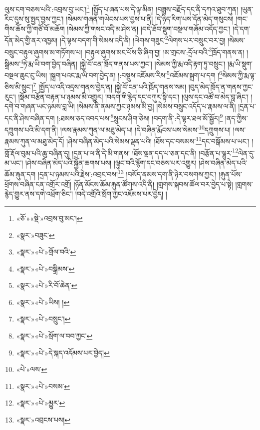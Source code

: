 ལུས་ངག་བཅས་པའི་:འབྲས་བུ་ཡང་།\footnote{«ཅོ་»«སྡེ་»འབྲས་བུ་མང་།} །སྤྱོད་པ་ཞན་པས་དེ་ལྟ་མིན། །བཟླས་བརྗོད་དང་ནི་དཀའ་ཐུབ་ཀུན། །ཡུན་རིང་དུས་སུ་སྤྱད་བྱས་ཀྱང་། །སེམས་གཞན་གཡེངས་པས་བྱས་པ་ནི། །དེ་ཉིད་རིག་པས་དོན་མེད་གསུངས། །གང་གིས་ཆོས་ཀྱི་གཙོ་བོ་མཆོག །སེམས་ཀྱི་གསང་འདི་མ་ཤེས་ན། །བདེ་ཐོབ་སྡུག་བསྔལ་གཞོམ་འདོད་ཀྱང་། །དེ་དག་དོན་མེད་གྱི་ནར་འཁྱམ། །དེ་ལྟས་བདག་གི་སེམས་འདི་ནི། །ལེགས་གཟུང་\footnote{«སྣར་»བཟུང་}ལེགས་པར་བསྲུང་བར་བྱ། །སེམས་བསྲུང་བརྟུལ་ཞུགས་མ་གཏོགས་པ། །བརྟུལ་ཞུགས་མང་པོས་ཅི་ཞིག་བྱ། །མ་གྲངས་:དྲོལ་བའི་\footnote{«སྣར་»«པེ་»གྲོལ་བའི་}ཁྲོད་གནས་ན། །སྒྲིམས་\footnote{«སྣར་»«པེ་»བསྒྲིམས་}ཏེ་རྨ་ཡི་བག་བྱེད་བཞིན། །སྐྱེ་བོ་ངན་ཁྲོད་གནས་པས་ཀྱང་། །སེམས་ཀྱི་རྨ་འདི་རྟག་ཏུ་བསྲུང་། །རྨ་ཡི་སྡུག་བསྔལ་ཆུང་ངུ་ཡིས། །སྐྲག་པའང་རྨ་ཡི་བག་བྱེད་ན། །:བསྡུས་འཇོམས་རིས་\footnote{«སྣར་»«པེ་»རི་བོ་ཆེན་}འཇོམས་སྐྲག་པ་དག །\footnote{«སྣར་»«པེ་»ཡིས། །}སེམས་ཀྱི་རྨ་ལྟ་ཅིས་མི་སྲུང་།\footnote{«སྣར་»«པེ་»བསྲུང་།} །སྤྱོད་པ་འདི་འདྲས་གནས་བྱེད་ན། །སྐྱེ་བོ་ངན་པའི་ཁྲོད་གནས་སམ། །བུད་མེད་ཁྲོད་ན་གནས་ཀྱང་རུང་། །སྡོམ་བརྩོན་བརྟན་པ་ཉམས་མི་འགྱུར། །བདག་གི་རྙེད་དང་བཀུར་སྟི་དང་། །ལུས་དང་འཚོ་བ་མེད་བླ་ཞིང་། །དགེ་བ་གཞན་ཡང་ཉམས་བླ་ཡི། །སེམས་ནི་ནམས་ཀྱང་ཉམས་མི་བྱ། །སེམས་བསྲུང་འདོད་པ་རྣམས་ལ་ནི། །དྲན་པ་དང་ནི་ཤེས་བཞིན་དག །:ཐམས་ཅད་འབད་པས་\footnote{«སྣར་»«པེ་»སྲོག་ལ་བབ་ཀྱང་}སྲུངས་ཤིག་ཅེས། །བདག་ནི་:དེ་ལྟར་ཐལ་མོ་སྦྱོར།\footnote{«སྣར་»«པེ་»དེ་སྐད་འདོམས་པར་བྱེད།} །ནད་ཀྱིས་དཀྲུགས་པའི་མི་དག་ནི། །ལས་རྣམས་ཀུན་ལ་མཐུ་མེད་པ། །དེ་བཞིན་རྨོངས་པས་སེམས་\footnote{«པེ་»ལས་}དཀྲུགས་པ། །ལས་རྣམས་ཀུན་ལ་མཐུ་མེད་དོ། །ཤེས་བཞིན་མེད་པའི་སེམས་ལྡན་པའི། །ཐོས་དང་བསམས་\footnote{«སྣར་»«པེ་»བསམ་}དང་བསྒོམས་པ་ཡང་། །གློ་རྡོལ་བུམ་པའི་ཆུ་བཞིན་དུ། །དྲན་པ་ལ་ནི་དེ་མི་གནས། །ཐོས་ལྡན་དད་པ་ཅན་དང་ནི། །བརྩོན་པ་ལྷུར་\footnote{«སྣར་»«པེ་»མྱུར་}ལེན་དུ་མ་ཡང་། །ཤེས་བཞིན་མེད་པའི་སྐྱོན་ཆགས་པས། །ལྟུང་བའི་རྙོག་དང་བཅས་པར་འགྱུར། །ཤེས་བཞིན་མེད་པའི་ཆོམ་རྐུན་དག །དྲན་པ་ཉམས་པའི་རྗེས་:འབྲང་བས།\footnote{«སྣར་»འབྲངས་པས།} །བསོད་ནམས་དག་ནི་ཉེར་བསགས་ཀྱང་། །རྐུན་པོས་ཕྲོགས་བཞིན་ངན་འགྲོར་འགྲོ། །ཉོན་མོངས་ཆོམ་རྐུན་ཚོགས་འདི་ནི། །གླགས་སྐབས་ཚོལ་བར་བྱེད་པ་སྟེ། །གླགས་རྙེད་གྱུར་ནས་དགེ་འཕྲོག་ཅིང་། །བདེ་འགྲོའི་སྲོག་ཀྱང་འཇོམས་པར་བྱེད། །
